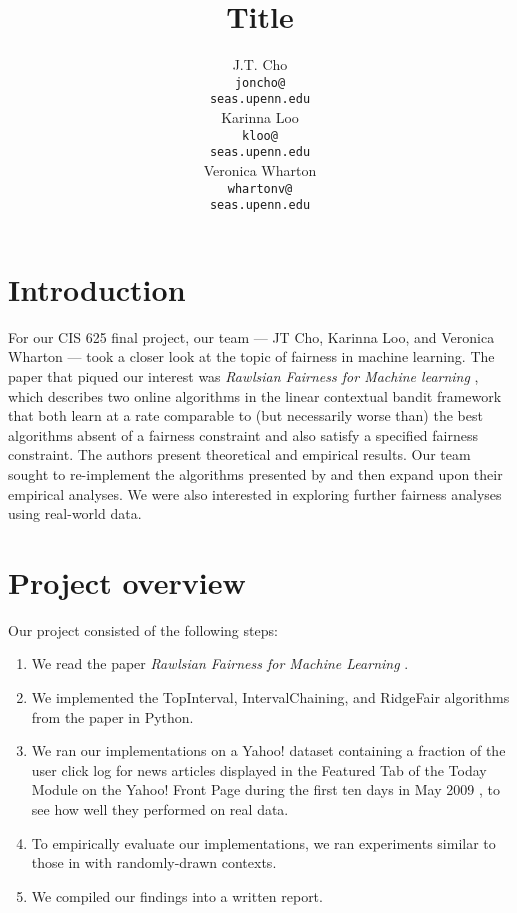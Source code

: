 \documentclass[11pt]{article}
\title{Title}
\author{J.T. Cho \\
	{\tt joncho@} \\
	{\tt seas.upenn.edu} \\\And
	Karinna Loo \\
	{\tt kloo@} \\
	{\tt seas.upenn.edu} \\\And
  	Veronica Wharton \\
  	{\tt whartonv@} \\
	{\tt seas.upenn.edu} }
\date{}
\begin{document}
\maketitle




\section{Introduction}

For our CIS 625 final project, our team --- JT Cho, Karinna Loo, and Veronica Wharton --- took a closer look at the topic of fairness in machine learning. The paper that piqued our interest was \textit{Rawlsian Fairness for Machine learning} \cite{DBLP:journals/corr/JosephKMNR16}, which describes two online algorithms in the linear contextual bandit framework that both learn at a rate comparable to (but necessarily worse than) the best algorithms absent of a fairness constraint and also satisfy a specified fairness constraint. The authors present theoretical and empirical results. Our team sought to re-implement the algorithms presented by  and then expand upon their empirical analyses. We were also interested in exploring further fairness analyses using real-world data.

\section{Project overview}

Our project consisted of the following steps:

\begin{enumerate}
	\item We read the paper \textit{Rawlsian Fairness for Machine Learning}  \cite{DBLP:journals/corr/JosephKMNR16}.
	\item We implemented the TopInterval, IntervalChaining, and RidgeFair algorithms from the paper in Python. 
	\item We ran our implementations on a Yahoo! dataset containing a fraction of the user click log for news articles displayed in the Featured Tab of the Today Module on the Yahoo! Front Page during the first ten days in May 2009 \cite{yahoo}, to see how well they performed on real data.
	\item To empirically evaluate our implementations, we ran experiments similar to those in \cite{DBLP:journals/corr/JosephKMNR16} with randomly-drawn contexts. 
	\item We compiled our findings into a written report.
\end{enumerate}
\end{document}
